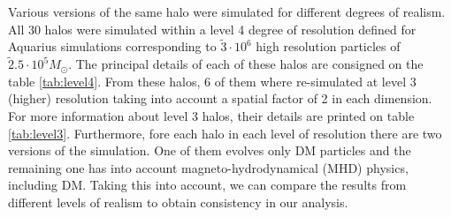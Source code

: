 Various versions of the same halo were simulated for different degrees of realism. All 30 halos were simulated within a level 4 degree of resolution defined for Aquarius simulations corresponding to $\tilde 3\cdot 10^6$ high resolution particles of $\tilde 2.5 \cdot 10^5 M_\odot$. The principal details of each of these halos are consigned on the table \ref{tab:level4}. From these halos, 6 of them where re-simulated at level 3 (higher) resolution taking into account a spatial factor of 2 in each dimension. For more information about level 3 halos, their details are printed on table \ref{tab:level3}. Furthermore, fore each halo in each level of resolution there are two versions of the simulation. One of them evolves only DM particles and the remaining one has into account magneto-hydrodynamical (MHD) physics, including DM. Taking this into account, we can compare the results from different levels of realism to obtain consistency in our analysis.\\


